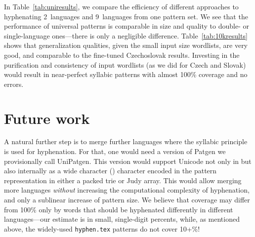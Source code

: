 \documentclass{csbulletin}
\let\program=\textrm %
\let\file=\texttt
\let\acro\relax
\providecommand\Dash{\unskip---}
\newcommand{\Patgen}{\program{Patgen}\xspace}
\newcommand{\XPatgen}{\program{UniPatgen}\xspace}
\begin{document}
In Table~\ref{tab:uniresults}, we compare the efficiency of different approaches to hyphenating 2~languages and 9~languages from one pattern set.
We see that the performance of universal patterns is comparable in size and quality to double- or single-language ones\Dash there is only a negligible difference.
Table~\ref{tab:10kresults} shows that generalization qualities, given the small input size wordlists, are very good, and comparable to the fine-tuned Czechoslovak results.
Investing in the purification and consistency of input wordlists (as we did for Czech and Slovak) would result in near-perfect syllabic patterns with almost 100\% coverage and no errors.  

 
\section{Future work} %
\label{sec:future}

A natural further step is to merge further languages where the syllabic principle is used for hyphenation.  
For that, one would need a version of \Patgen we provisionally call \XPatgen. 
This version would support Unicode not only in \acro{I/O} but also internally as a wide character (\mbox{\acro{UTF-16}}) character encoded in the pattern representation in either a packed trie or Judy array.
This would allow merging more languages \emph{without} increasing the computational complexity of hyphenation, and only a sublinear increase of pattern size.
We believe that coverage may differ from 100\% only by words that should be hyphenated differently in different languages\Dash our estimate is in small, single-digit percents, while, as mentioned above, the widely-used \file{hyphen.tex} patterns do not cover 10+\%!
\end{document}
